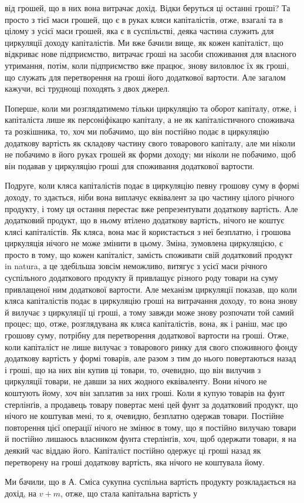 \parcont{}  %
від грошей, що в них вона витрачає дохід. Відки беруться ці останні
гроші? Та просто з тієї маси грошей, що є в руках кляси капіталістів,
отже, взагалі та в цілому з усієї маси грошей, яка є в суспільстві,
деяка частина служить для циркуляції доходу капіталістів. Ми
вже бачили вище, як кожен капіталіст, що відкриває нове підприємство,
витрачає гроші на засоби споживання для власного утримання, потім,
коли підприємство вже працює, знову виловлює їх як гроші, що служать
для перетворення на гроші його додаткової вартости. Але загалом кажучи,
всі труднощі походять з двох джерел.

Поперше, коли ми розглядатимемо тільки циркуляцію та оборот капіталу,
отже, і капіталіста лише як персоніфікацю капіталу, а не як капіталістичного
споживача та розкішника, то, хоч ми побачимо, що він
постійно подає в циркуляцію додаткову вартість як складову частину
свого товарового капіталу, але ми ніколи не побачимо в його руках грошей
як форми доходу; ми ніколи не побачимо, щоб він подавав у циркуляцію
гроші для споживання додаткової вартости.

Подруге, коли кляса капіталістів подає в циркуляцію певну грошову
суму в формі доходу, то здається, ніби вона виплачує еквівалент за цю
частину цілого річного продукту, і тому ця остання перестає вже репрезентувати
додаткову вартість. Але додатковий продукт, що в ньому
втілено додаткову вартість, нічого не коштує клясі капіталістів. Як кляса,
вона має й користається з неї безплатно, і грошова циркуляція нічого
не може змінити в цьому. Зміна, зумовлена циркуляцією, є просто в тому,
що кожен капіталіст, замість споживати свій додатковий продукт in natura,
а це здебільша зовсім неможливо, витягує з усієї маси річного суспільного
додаткового продукту й привлащує різного роду товари на суму
привлащеної ним додаткової вартости. Але механізм циркуляції показав,
що коли кляса капіталістів подає в циркуляцію гроші на витрачання
доходу, то вона знову й вилучає з циркуляції ці гроші, а тому завжди
може знову розпочати той самий процес; що, отже, розглядувана як
кляса капіталістів, вона, як і раніш, має цю грошову суму, потрібну для
перетворення додаткової вартости на гроші. Отже, коли капіталіст не
лише вилучає з товарового ринку для свого споживного фонду додаткову
вартість у формі товарів, але разом з тим до нього повертаються назад
і гроші, що на них він купив ці товари, то, очевидно, що він вилучив
з циркуляції товари, не давши за них жодного еквіваленту. Вони нічого
не коштують йому, хоч він заплатив за них гроші. Коли я купую товарів
на фунт стерлінґів, а продавець товару повертає мені цей фунт за додатковий
продукт, що нічого не коштував мені, то я, очевидно, безплатно
одержав товари. Постійне повторення цієї операції нічого не змінює в
тому, що я постійно вилучаю товари й постійно лишаюсь власником
фунта стерлінґів, хоч, щоб одержати товари, я на деякий час віддаю
його. Капіталіст постійно одержує ці гроші назад як перетворену на
гроші додаткову вартість, яка нічого не коштувала йому.

Ми бачили, що в А. Сміса сукупна суспільна вартість продукту розкладається
на дохід, на $v + m$, отже, що стала капітальна вартість у
\parbreak{}  %
